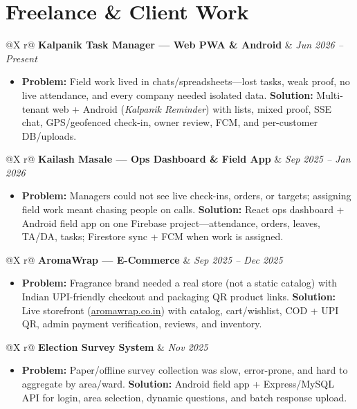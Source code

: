 \documentclass[9pt,a4paper]{extarticle}
\makeatletter
\newcommand{\role}[3]{%
  \noindent
  \begin{tabularx}{\textwidth}{@{}X r@{}}
    \textbf{#1} & \textit{\footnotesize #3} \\
    \multicolumn{2}{@{}l@{}}{\textcolor{muted}{\footnotesize #2}}
  \end{tabularx}\par\vspace{0.08em}%
}
\makeatother
\begin{document}
\section*{Freelance \& Client Work}

\role{Kalpanik Task Manager --- Web PWA \& Android}{Vite, Bootstrap, Node.js, Express, Prisma, MySQL, Java (Android)}{Jun 2026 -- Present}
\begin{itemize}
  \item \textbf{Problem:} Field work lived in chats/spreadsheets---lost tasks, weak proof, no live attendance, and every company needed isolated data. \textbf{Solution:} Multi-tenant web + Android (\textit{Kalpanik Reminder}) with lists, mixed proof, SSE chat, GPS/geofenced check-in, owner review, FCM, and per-customer DB/uploads.
\end{itemize}

\vspace{0.1em}
\role{Kailash Masale --- Ops Dashboard \& Field App}{React, Vite, Firebase, Java (Android)}{Sep 2025 -- Jan 2026}
\begin{itemize}
  \item \textbf{Problem:} Managers could not see live check-ins, orders, or targets; assigning field work meant chasing people on calls. \textbf{Solution:} React ops dashboard + Android field app on one Firebase project---attendance, orders, leaves, TA/DA, tasks; Firestore sync + FCM when work is assigned.
\end{itemize}

\vspace{0.1em}
\role{AromaWrap --- E-Commerce}{React, TypeScript, Express, Prisma, MySQL}{Sep 2025 -- Dec 2025}
\begin{itemize}
  \item \textbf{Problem:} Fragrance brand needed a real store (not a static catalog) with Indian UPI-friendly checkout and packaging QR product links. \textbf{Solution:} Live storefront (\href{https://aromawrap.co.in}{aromawrap.co.in}) with catalog, cart/wishlist, COD + UPI QR, admin payment verification, reviews, and inventory.
\end{itemize}

\vspace{0.1em}
\role{Election Survey System}{Java (Android), Node.js, Express, MySQL}{Nov 2025}
\begin{itemize}
  \item \textbf{Problem:} Paper/offline survey collection was slow, error-prone, and hard to aggregate by area/ward. \textbf{Solution:} Android field app + Express/MySQL API for login, area selection, dynamic questions, and batch response upload.
\end{itemize}
\end{document}
